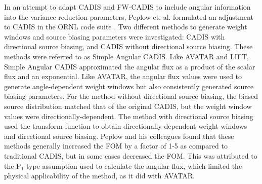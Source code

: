 In an attempt to adapt CADIS and FW-CADIS to include angular information into
the variance reduction parameters,
Peplow et. al. formulated an adjustment to CADIS in the ORNL
code suite \cite{peplow_consistent_2012}. Two different
methods to generate weight windows and source biasing parameters
were investigated:
CADIS with directional source biasing, and CADIS without directional source
biasing. These methods were referred to as Simple Angular CADIS. Like AVATAR and
LIFT, Simple Angular CADIS approximated the angular flux as a product of the
scalar flux and an exponential. Like AVATAR, the angular flux values
were used to
generate angle-dependent weight windows but also consistently generated source
biasing parameters. For the method without
directional source biasing, the biased source distribution matched that of the
original CADIS, but the weight window values were directionally-dependent. The
method with directional source biasing used the transform function to obtain
directionally-dependent weight windows and directional source biasing.
Peplow and his colleagues found
that these methods generally increased the FOM by a factor of 1-5 as compared to
traditional CADIS, but in some
cases decreased the FOM. This was attributed to the P$_1$ type assumption used
to calculate the angular flux, which limited the physical applicability of the
method, as it did with AVATAR.

